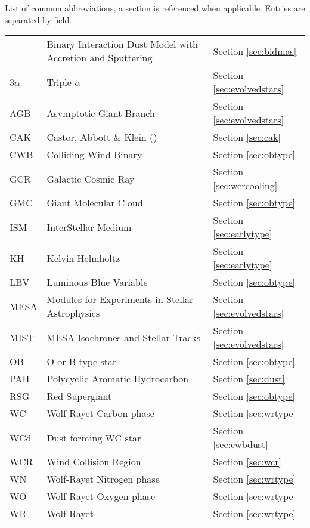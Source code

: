 \begin{abbreviations}
List of common abbreviations, a section is referenced when applicable. Entries are separated by field.

\begin{longtable}[c]{lll}
  \hline
  \endhead
  \hline
  \endfoot
    
  \multicolumn{3}{c}{\textbf{Physics}} \\
  \hline

  \bidmas{} & Binary Interaction Dust Model with Accretion and Sputtering & Section \ref{sec:bidmas} \\
  3$\alpha$ & Triple-$\alpha$ & Section \ref{sec:evolvedstars} \\
  AGB & Asymptotic Giant Branch & Section \ref{sec:evolvedstars} \\
  CAK & Castor, Abbott \& Klein (\citeyear{castor_radiation-driven_1975}) & Section \ref{sec:cak} \\
  CWB & Colliding Wind Binary  & Section \ref{sec:obtype} \\
  GCR & Galactic Cosmic Ray & Section \ref{sec:wcrcooling} \\
  GMC & Giant Molecular Cloud & Section \ref{sec:obtype}\\
  ISM & InterStellar Medium & Section \ref{sec:earlytype} \\
  KH  & Kelvin-Helmholtz & Section \ref{sec:earlytype} \\ 
  LBV & Luminous Blue Variable & Section \ref{sec:obtype} \\
  MESA & Modules for Experiments in Stellar Astrophysics & Section \ref{sec:evolvedstars} \\
  MIST & MESA Isochrones and Stellar Tracks & Section \ref{sec:evolvedstars} \\
  OB  & O or B type star & Section \ref{sec:obtype} \\ 
  PAH & Polycyclic Aromatic Hydrocarbon & Section \ref{sec:dust} \\
  RSG & Red Supergiant & Section \ref{sec:obtype} \\
  WC  & Wolf-Rayet Carbon phase & Section \ref{sec:wrtype} \\
  WCd & Dust forming WC star & Section \ref{sec:cwbdust} \\
  WCR & Wind Collision Region & Section \ref{sec:wcr} \\
  WN  & Wolf-Rayet Nitrogen phase & Section \ref{sec:wrtype} \\
  WO  & Wolf-Rayet Oxygen phase & Section \ref{sec:wrtype} \\
  WR  & Wolf-Rayet & Section \ref{sec:wrtype} \\


\end{longtable}
\end{abbreviations}
